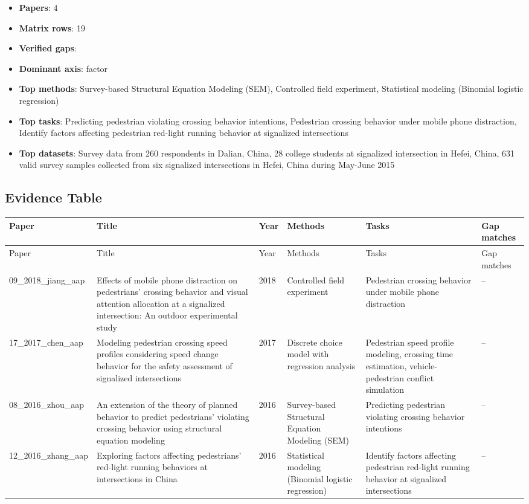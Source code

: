 \documentclass{article}
\begin{document}
\begin{itemize}
\item \textbf{Papers}: 4
\item \textbf{Matrix rows}: 19
\item \textbf{Verified gaps}: 
\item \textbf{Dominant axis}: factor
\item \textbf{Top methods}: Survey-based Structural Equation Modeling (SEM), Controlled field experiment, Statistical modeling (Binomial logistic regression)
\item \textbf{Top tasks}: Predicting pedestrian violating crossing behavior intentions, Pedestrian crossing behavior under mobile phone distraction, Identify factors affecting pedestrian red-light running behavior at signalized intersections
\item \textbf{Top datasets}: Survey data from 260 respondents in Dalian, China, 28 college students at signalized intersection in Hefei, China, 631 valid survey samples collected from six signalized intersections in Hefei, China during May-June 2015
\end{itemize}

\subsection{Evidence Table}
\begin{longtable}{p{}p{}p{}p{}p{}p{}}
\toprule
Paper & Title & Year & Methods & Tasks & Gap matches \\
\midrule
\endfirsthead
\toprule
Paper & Title & Year & Methods & Tasks & Gap matches \\
\midrule
\endhead
09\_2018\_jiang\_aap & Effects of mobile phone distraction on pedestrians' crossing behavior and visual attention allocation at a signalized intersection: An outdoor experimental study & 2018 & Controlled field experiment & Pedestrian crossing behavior under mobile phone distraction & -- \\
17\_2017\_chen\_aap & Modeling pedestrian crossing speed profiles considering speed change behavior for the safety assessment of signalized intersections & 2017 & Discrete choice model with regression analysis & Pedestrian speed profile modeling, crossing time estimation, vehicle-pedestrian conflict simulation & -- \\
08\_2016\_zhou\_aap & An extension of the theory of planned behavior to predict pedestrians' violating crossing behavior using structural equation modeling & 2016 & Survey-based Structural Equation Modeling (SEM) & Predicting pedestrian violating crossing behavior intentions & -- \\
12\_2016\_zhang\_aap & Exploring factors affecting pedestrians' red-light running behaviors at intersections in China & 2016 & Statistical modeling (Binomial logistic regression) & Identify factors affecting pedestrian red-light running behavior at signalized intersections & -- \\
\bottomrule
\end{longtable}
\end{document}
